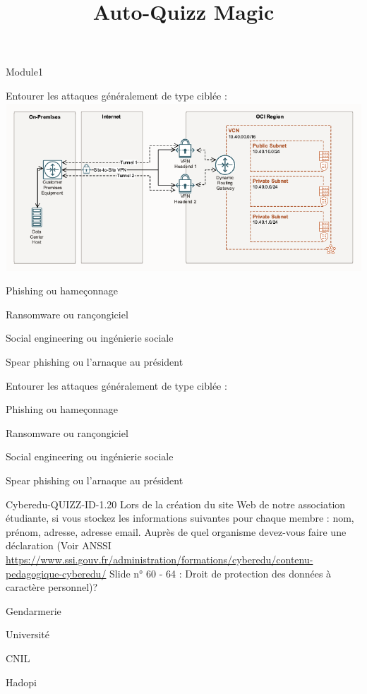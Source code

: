 \documentclass[12pt, LuaLaTeX]{article}
\title{Auto-Quizz Magic}
\author{\QuizzName}
\def\QuizzName{Module1}
\begin{document}
\maketitle

\begin{quiz}{\QuizzName}
 	
\begin{multi}[multiple=true]{\QuizzID}
	Entourer les attaques généralement de type  ciblée :\\
	\includegraphics[scale=0.5]{pictures/image.png}
	
\item 	Phishing ou hameçonnage
\item 	Ransomware ou rançongiciel
\item* 	Social engineering ou ingénierie sociale
\item* 	Spear phishing ou l'arnaque au président
\end{multi}

\begin{multi}[multiple=true]{\QuizzID}
	Entourer les attaques généralement de type  ciblée :
\item 	Phishing ou hameçonnage
\item 	Ransomware ou rançongiciel
\item* 	Social engineering ou ingénierie sociale
\item* 	Spear phishing ou l'arnaque au président
\end{multi}

\begin{multi}[multiple=true]{Cyberedu-QUIZZ-ID-1.20}
	Lors de la création du site Web de notre association étudiante, si vous stockez les informations suivantes pour chaque membre : nom, prénom, adresse, adresse email. Auprès de quel organisme devez-vous faire une déclaration (Voir ANSSI \url{https://www.ssi.gouv.fr/administration/formations/cyberedu/contenu-pedagogique-cyberedu/} Slide n° 60 - 64 : Droit de protection des données à caractère personnel)?
\item 	Gendarmerie
\item 	Université
\item* 	CNIL
\item 	Hadopi
\end{multi}
   	
 \end{quiz}
\end{document}
